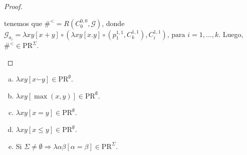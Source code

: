 \begin{proof}
\begin{enumerate}[a)]
        \par tenemos que $\#^{<} = R(C_{0}^{0, 0}, \mathcal{G})$, donde $\mathcal{G}_{a_{i}} = \lambda xy
        \left[x+y\right] \circ (\lambda xy \left[x.y\right] \circ (p_{1}^{1, 1}, C_{k}^{1, 1}), C_{i}^{1, 1})
        \text{, para } i = 1, \dotsc, k$. Luego, $\#^{<} \in \mathrm{PR}^{\Sigma}$.
    \end{enumerate}
  \end{proof}

  \begin{lemma}
    \begin{enumerate}[a)]
      \item $\lambda xy \left[x \dot{-}y\right] \in \mathrm{PR}^{\emptyset}$.
      \item $\lambda xy \left[\max (x,y)\right] \in \mathrm{PR}^{\emptyset}$.
      \item $\lambda xy \left[x=y\right] \in \mathrm{PR}^{\emptyset}$.
      \item $\lambda xy \left[x \leq y\right] \in \mathrm{PR}^{\emptyset}$.
      \item Si $\Sigma \neq \emptyset \Rightarrow \lambda \alpha \beta \left[\alpha = \beta\right] \in
        \mathrm{PR}^{\Sigma}$.
    \end{enumerate}
  \end{lemma}
